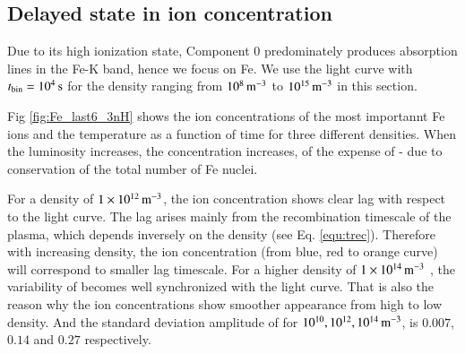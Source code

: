 \documentclass{aa}
\begin{document}
\subsection{Delayed state in ion concentration}\label{subsect:delayed state}

Due to its high ionization state, Component $0$ predominately produces absorption lines in the Fe-K band, hence we focus on Fe.
We use the light curve with $ t_{\rm bin}=10^4 \, \rm s$ for the density ranging from $10^8 \, \rm m^{-3}$ to $10^{15} \, \rm m^{-3}$ in this section.





Fig \ref{fig:Fe_last6_3nH} shows the ion concentrations of the most importannt Fe ions and the temperature as a function of time for three different densities. When the luminosity increases, the  concentration increases, of the expense of  -  due to conservation of the total number of Fe nuclei.


For a density of $1 \times 10^{12} \, \rm m^{-3}$, the  ion concentration shows clear lag with respect to the light curve.
The lag arises mainly from the recombination timescale of the plasma, which depends inversely on the density (see Eq. \ref{equ:trec}).
Therefore with increasing density, the  ion concentration (from blue, red to orange curve) will correspond to smaller lag timescale. For a higher density of $1 \times 10^{14} \rm \, m^{-3}$ , the variability of  becomes well synchronized with the light curve.
That is also the reason why the ion concentrations show smoother appearance from high to low density.
And the standard deviation amplitude of  for $10^{10}, 10^{12}, 10^{14} \, \rm m^{-3}$, is $0.007$, $0.14$ and $0.27$ respectively.
\end{document}
